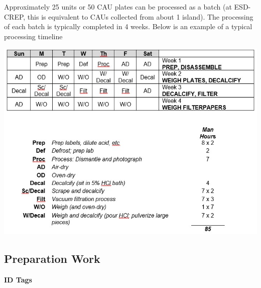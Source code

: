 \documentclass[]{book}
\begin{document}
Approximately 25 units or 50 CAU plates can be processed as a batch (at ESD-CREP, this is equivalent to CAUs collected from about 1 island). The processing of each batch is typically completed in 4 weeks. Below is an example of a typical processing timeline

\includegraphics{images/CAU_table.jpg}

\hypertarget{preparation-work}{%
\subsection{Preparation Work}\label{preparation-work}}

\textbf{ID Tags}
\end{document}

